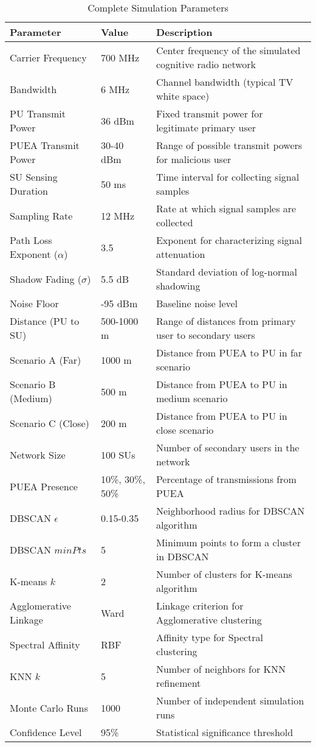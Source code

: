 \begin{table}[htbp]
\centering
\caption{Complete Simulation Parameters}
\label{tab:sim_params}
\begin{tabular}{@{}llp{8cm}@{}}
\toprule
\textbf{Parameter} & \textbf{Value} & \textbf{Description} \\ \midrule
Carrier Frequency & 700 MHz & Center frequency of the simulated cognitive radio network \\
Bandwidth & 6 MHz & Channel bandwidth (typical TV white space) \\
PU Transmit Power & 36 dBm & Fixed transmit power for legitimate primary user \\
PUEA Transmit Power & 30-40 dBm & Range of possible transmit powers for malicious user \\
SU Sensing Duration & 50 ms & Time interval for collecting signal samples \\
Sampling Rate & 12 MHz & Rate at which signal samples are collected \\
Path Loss Exponent ($\alpha$) & 3.5 & Exponent for characterizing signal attenuation \\
Shadow Fading ($\sigma$) & 5.5 dB & Standard deviation of log-normal shadowing \\
Noise Floor & -95 dBm & Baseline noise level \\
Distance (PU to SU) & 500-1000 m & Range of distances from primary user to secondary users \\
Scenario A (Far) & 1000 m & Distance from PUEA to PU in far scenario \\
Scenario B (Medium) & 500 m & Distance from PUEA to PU in medium scenario \\
Scenario C (Close) & 200 m & Distance from PUEA to PU in close scenario \\
Network Size & 100 SUs & Number of secondary users in the network \\
PUEA Presence & 10\%, 30\%, 50\% & Percentage of transmissions from PUEA \\
DBSCAN $\epsilon$ & 0.15-0.35 & Neighborhood radius for DBSCAN algorithm \\
DBSCAN $minPts$ & 5 & Minimum points to form a cluster in DBSCAN \\
K-means $k$ & 2 & Number of clusters for K-means algorithm \\
Agglomerative Linkage & Ward & Linkage criterion for Agglomerative clustering \\
Spectral Affinity & RBF & Affinity type for Spectral clustering \\
KNN $k$ & 5 & Number of neighbors for KNN refinement \\
Monte Carlo Runs & 1000 & Number of independent simulation runs \\
Confidence Level & 95\% & Statistical significance threshold \\
\bottomrule
\end{tabular}
\end{table}

